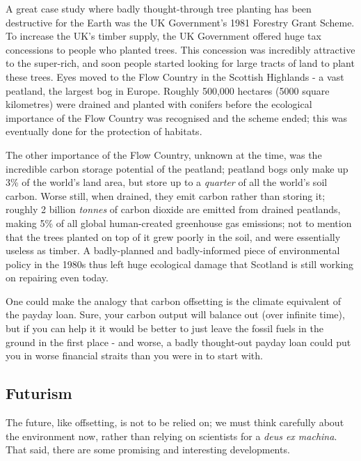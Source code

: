 \documentclass{article}
\begin{document}
A great case study where badly thought-through tree planting has been destructive for the Earth was the UK Government's 1981 Forestry Grant Scheme. To increase the UK's timber supply, the UK Government offered huge tax concessions to people who planted trees. \citep{watkins1983public} This concession was incredibly attractive to the super-rich, and soon people started looking for large tracts of land to plant these trees. Eyes moved to the Flow Country in the Scottish Highlands - a vast peatland, the largest bog in Europe. Roughly 500,000 hectares (5000 square kilometres) were drained and planted with conifers before the ecological importance of the Flow Country was recognised and the scheme ended; this was eventually done for the protection of habitats. 

The other importance of the Flow Country, unknown at the time, was the incredible carbon storage potential of the peatland; peatland bogs only make up 3\% of the world's land area, but store up to a \emph{quarter} of all the world's soil carbon. \citep{turetsky2015global} Worse still, when drained, they emit carbon rather than storing it; roughly 2 billion \emph{tonnes} of carbon dioxide are emitted from drained peatlands, making 5\% of all global human-created greenhouse gas emissions; not to mention that the trees planted on top of it grew poorly in the soil, and were essentially useless as timber. A badly-planned and badly-informed piece of environmental policy in the 1980s thus left huge ecological damage that Scotland is still working on repairing even today. \citep{gewin2020peat} \newline

One could make the analogy that carbon offsetting is the climate equivalent of the payday loan. Sure, your carbon output will balance out (over infinite time), but if you can help it it would be better to just leave the fossil fuels in the ground in the first place - and worse, a badly thought-out payday loan could put you in worse financial straits than you were in to start with.


\subsection{Futurism}
The future, like offsetting, is not to be relied on; we must think carefully about the environment now, rather than relying on scientists for a \emph{deus ex machina}. That said, there are some promising and interesting developments.\newline
\end{document}

